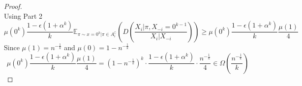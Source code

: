 \begin{proof}
\begin{equation*}
\end{equation*}
Using Part 2
\begin{equation*}
    \mu(0^k) \frac{1 - \epsilon (1 + \alpha ^k)}{k} \mathbb{E}_{\pi \sim x = 0^k| \pi \in A_{i}^\complement} \left( D\left(\frac{X_i | \pi, X_{-i} = 0^{k-1}}{X_i | X_{-i}} \right) \right) \geq \mu(0^k) \frac{1 - \epsilon (1 + \alpha ^k)}{k} \frac{\mu(1)}{4}
\end{equation*}
Since $\mu(1) = n^{-\frac{1}{k}}$ and $\mu(0) = 1 - n^{-\frac{1}{k}}$
\begin{equation*}
    \mu(0^k) \frac{1 - \epsilon (1 + \alpha ^k)}{k} \frac{\mu(1)}{4} = \left (1 - n^{-\frac{1}{k}} \right)^{k} \cdot \frac{1 - \epsilon (1 + \alpha ^k)}{k} \cdot \frac{n^{-\frac{1}{k}}}{4} \in \Omega\left(\frac{n^{-\frac{1}{k}}}{k}\right)
\end{equation*}
\end{proof}